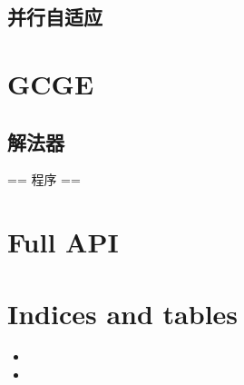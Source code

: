 \documentclass[letterpaper,10pt,english]{sphinxmanual}
\begin{document}
\section{并行自适应}
\label{\detokenize{src/openpfem/openpfem:id1}}\label{\detokenize{src/openpfem/openpfem::doc}}
\sphinxstepscope


\chapter{GCGE}
\label{\detokenize{src/gcge/main:gcge}}\label{\detokenize{src/gcge/main::doc}}

\section{解法器}
\label{\detokenize{src/gcge/main:id1}}
\sphinxstepscope

\sphinxAtStartPar
==
程序
==


\chapter{Full API}
\label{\detokenize{api/library_root:full-api}}\label{\detokenize{api/library_root::doc}}

\chapter{Indices and tables}
\label{\detokenize{index:indices-and-tables}}\begin{itemize}
\item {} 
\sphinxAtStartPar
{}

\item {} 
\sphinxAtStartPar
{}

\end{itemize}



\renewcommand{\indexname}{Index}
\printindex
\end{document}
